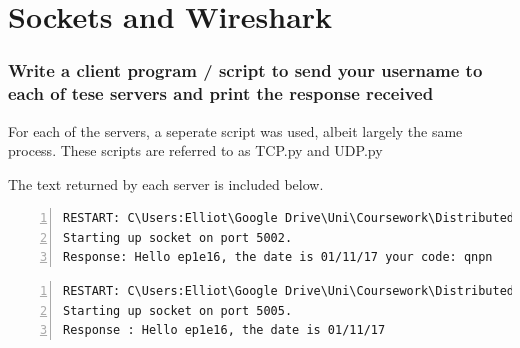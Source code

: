\part{Sockets and Wireshark}
\section{Write a client program / script to send your username to each of tese servers and print the response received}
\begin{normalsize}
For each of the servers, a seperate script was used, albeit largely the same process. These scripts are referred to as TCP.py and UDP.py
\end{normalsize}



\newpage

\begin{normalsize}
The text returned by each server is included below.
\end{normalsize}
\begin{lstlisting}[breaklines, frame=single, title=TCP, numbers=left]
RESTART: C\Users:Elliot\Google Drive\Uni\Coursework\Distributed Systems and Networks\Python\TCP.py
Starting up socket on port 5002.
Response: Hello ep1e16, the date is 01/11/17 your code: qnpn
\end{lstlisting}
\begin{lstlisting}[breaklines, frame=single, title=UDP, numbers=left]
RESTART: C\Users:Elliot\Google Drive\Uni\Coursework\Distributed Systems and Networks\Python\UDP.py
Starting up socket on port 5005.
Response : Hello ep1e16, the date is 01/11/17
\end{lstlisting}
